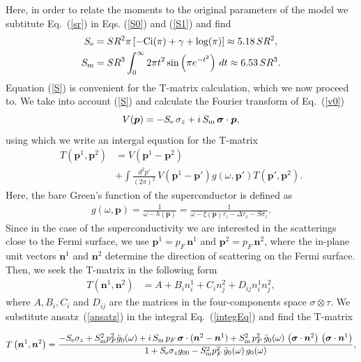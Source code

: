 \documentclass[twocolumn,showpacs,floatfix,longbibliography]{revtex4-1}
\begin{document}
Here, in order to relate the moments to the original parameters of the model we subtitute Eq.~(\ref{sr}) in Eqs. (\ref{S0}) and (\ref{S1}) and find 
\begin{align}
	S_{\rm e} &= SR^2 \pi  \left [-\text{Ci}(\pi )+\gamma +\log (\pi )\right] \approx 5.18\, SR^2, \\
	S_{\rm m} &= SR^3 \int_0^{\infty } 2 \pi  t^2 \sin \left(\pi  e^{-t^2}\right) \, dt \approx 6.53\, SR^3.
\end{align}
Equation  (\ref{S}) is convenient for the T-matrix calculation, which we now proceed to. We take into account (\ref{S}) and calculate the Fourier transform of Eq.~(\ref{v0})  
\begin{equation}
	V(\bm p) = -S_{\rm e}\,\sigma_z +  i \,S_{\rm m} \, \bm \sigma\cdot \bm  p,
	\label{vp}
\end{equation}
using which we write an intergal equation for the T-matrix
\begin{align}
	T\left(\bm p^{1},\bm p^{2}\right) &= V \left(\bm p^{1}-\bm p^{2}\right) \nonumber \\
	& +\int \frac{d^2 p'}{\left( 2\pi \right)^2}\, V\left(\bm p^{1}-\bm p'\right) g(\omega,\bm p')  T\left(\bm p',\bm p^{2}\right).
	\label{integEq}
\end{align}
Here, the bare Green's function of the superconductor is defined as 
\begin{align}
	g(\omega,\bm p) = \frac{1}{\omega-h(\bm p)} = \frac{1}{\omega-\xi(\bm p)\tau_z-\Delta \tau_x - S\sigma_z}. \label{g}
\end{align}
Since in the case of the superconductivity we are interested in the scatterings close to the Fermi surface, we use $\bm p^{1} = p_F\, \bm n^{1}$ and $\bm p^{2} = p_F \,\bm n^{2}$, where the in-plane unit vectors $\bm n^{1}$ and $\bm n^{2}$ determine the direction of scattering on the Fermi surface.  Then, we seek the T-matrix in the following form
\begin{align}
	T\left(\bm n^{1},\bm n^{2}\right) &= A + B_i n^{1}_i + C_i n^{2}_j + D_{ij} n^{1}_i n^{2}_j, \label{ansatz}
\end{align}
where  $A,B_i,C_i$ and $D_{ij}$ are the matrices in the four-components space $\sigma\otimes\tau$. We substitute ansatz~(\ref{ansatz}) in the integral Eq.~(\ref{integEq}) and find the T-matrix
\begin{widetext}
\begin{equation}
	T\left(\bm n^{1},\bm n^{2}\right) = \frac{-S_{\rm e}\sigma_z+S^2_{\rm m}p_F^2\bar g_{0}(\omega)+i\,S_{\rm m}\,p_F \,  \bm \sigma\cdot(\bm n^{2}- \bm n^{1}) +S^2_{\rm m}\, p^2_F \, \bar g_{0}(\omega)\,\left(\bm \sigma\cdot\bm n^{2}\right)\,\left(\bm \sigma\cdot \bm n^{1}\right)}{1+S_{\rm e}\sigma_zg_{00}-S^2_{\rm m}p_F^2\,\bar g_{0}(\omega)\, g_{0}(\omega)}, \label{TM}
\end{equation}
\end{widetext}
\end{document}
